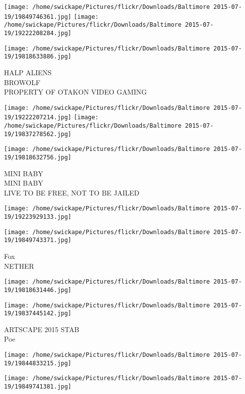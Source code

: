 \documentclass[10pt,letterpaper]{article}
\begin{document}
\texttt{[image: /home/swickape/Pictures/flickr/Downloads/Baltimore 2015-07-19/19849746361.jpg]}
\texttt{[image: /home/swickape/Pictures/flickr/Downloads/Baltimore 2015-07-19/19222208284.jpg]}

\vspace{0.25in}
\texttt{[image: /home/swickape/Pictures/flickr/Downloads/Baltimore 2015-07-19/19818633886.jpg]}

HALP ALIENS\\
BROWOLF\\
PROPERTY OF OTAKON VIDEO GAMING
\pagebreak

\texttt{[image: /home/swickape/Pictures/flickr/Downloads/Baltimore 2015-07-19/19222207214.jpg]}
\texttt{[image: /home/swickape/Pictures/flickr/Downloads/Baltimore 2015-07-19/19837278562.jpg]}

\vspace{0.25in}
\texttt{[image: /home/swickape/Pictures/flickr/Downloads/Baltimore 2015-07-19/19818632756.jpg]}

MINI BABY\\
MINI BABY\\
LIVE TO BE FREE, NOT TO BE JAILED
\pagebreak

\texttt{[image: /home/swickape/Pictures/flickr/Downloads/Baltimore 2015-07-19/19223929133.jpg]}

\vspace{0.25in}
\texttt{[image: /home/swickape/Pictures/flickr/Downloads/Baltimore 2015-07-19/19849743371.jpg]}

Fox\\
NETHER
\pagebreak

\texttt{[image: /home/swickape/Pictures/flickr/Downloads/Baltimore 2015-07-19/19818631446.jpg]}

\vspace{0.25in}
\texttt{[image: /home/swickape/Pictures/flickr/Downloads/Baltimore 2015-07-19/19837445142.jpg]}

ARTSCAPE 2015 STAB\\
Poe
\pagebreak

\texttt{[image: /home/swickape/Pictures/flickr/Downloads/Baltimore 2015-07-19/19844833215.jpg]}

\vspace{0.25in}
\texttt{[image: /home/swickape/Pictures/flickr/Downloads/Baltimore 2015-07-19/19849741381.jpg]}
\end{document}
